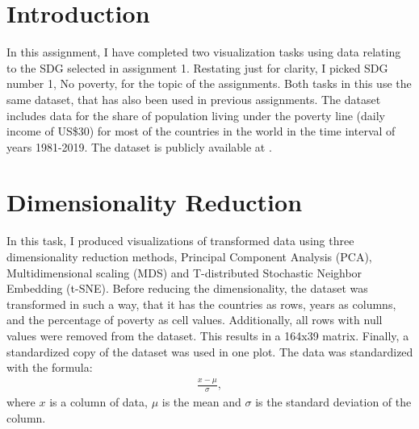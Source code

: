 \documentclass[11pt,a4paper,titlepage]{article}
\begin{document}



\section*{Introduction}

In this assignment, I have completed two visualization tasks using data relating to the SDG selected in assignment 1. Restating just for clarity, I picked SDG number 1, No poverty, for the topic of the assignments. Both tasks in this use the same dataset, that has also been used in previous assignments. The dataset includes data for the share of population living under the poverty line (daily income of US\$30) for most of the countries in the world in the time interval of years 1981-2019. The dataset is publicly available at \cite{data}.

\section{Dimensionality Reduction}

In this task, I produced visualizations of transformed data using three dimensionality reduction methods, Principal Component Analysis (PCA), Multidimensional scaling (MDS) and T-distributed Stochastic Neighbor Embedding (t-SNE). Before reducing the dimensionality, the dataset was transformed in such a way, that it has the countries as rows, years as columns, and the percentage of poverty as cell values. Additionally, all rows with null values were removed from the dataset. This results in a 164x39 matrix. Finally, a standardized copy of the dataset was used in one plot. The data was standardized with the formula:
\begin{align*}
    \frac{x - \mu}{\sigma},
\end{align*} where $x$ is a column of data, $\mu$ is the mean and $\sigma$ is the standard deviation of the column.
\end{document}
